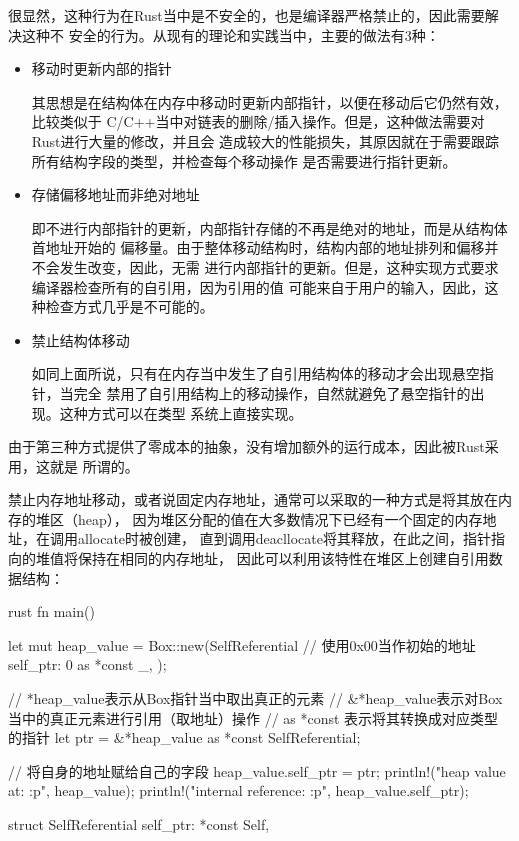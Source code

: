 很显然，这种行为在Rust当中是不安全的，也是编译器严格禁止的，因此需要解决这种不
安全的行为。从现有的理论和实践当中，主要的做法有3种：
\begin{itemize}
  \item 移动时更新内部的指针

  其思想是在结构体在内存中移动时更新内部指针，以便在移动后它仍然有效，比较类似于
  C/C++当中对链表的删除/插入操作。但是，这种做法需要对Rust进行大量的修改，并且会
  造成较大的性能损失，其原因就在于需要跟踪所有结构字段的类型，并检查每个移动操作
  是否需要进行指针更新。

  \item 存储偏移地址而非绝对地址

  即不进行内部指针的更新，内部指针存储的不再是绝对的地址，而是从结构体首地址开始的
  偏移量。由于整体移动结构时，结构内部的地址排列和偏移并不会发生改变，因此，无需
  进行内部指针的更新。但是，这种实现方式要求编译器检查所有的自引用，因为引用的值
  可能来自于用户的输入，因此，这种检查方式几乎是不可能的。

  \item 禁止结构体移动

  如同上面所说，只有在内存当中发生了自引用结构体的移动才会出现悬空指针，当完全
  禁用了自引用结构上的移动操作，自然就避免了悬空指针的出现。这种方式可以在类型
  系统上直接实现。
\end{itemize}

由于第三种方式提供了零成本的抽象，没有增加额外的运行成本，因此被Rust采用，这就是
所谓的。

禁止内存地址移动，或者说固定内存地址，通常可以采取的一种方式是将其放在内存的堆区（heap），
因为堆区分配的值在大多数情况下已经有一个固定的内存地址，在调用allocate时被创建，
直到调用deacllocate将其释放，在此之间，指针指向的堆值将保持在相同的内存地址，
因此可以利用该特性在堆区上创建自引用数据结构：
\begin{code-block}{rust}
fn main() {
    let mut heap_value = Box::new(SelfReferential {
        // 使用0x00当作初始的地址
        self_ptr: 0 as *const _,
    });

    // *heap_value表示从Box指针当中取出真正的元素
    // &*heap_value表示对Box当中的真正元素进行引用（取地址）操作
    // as *const 表示将其转换成对应类型的指针
    let ptr = &*heap_value as *const SelfReferential;

    // 将自身的地址赋给自己的字段
    heap_value.self_ptr = ptr;
    println!("heap value at: {:p}", heap_value);
    println!("internal reference: {:p}", heap_value.self_ptr);
}
struct SelfReferential {
    self_ptr: *const Self,
}
\end{code-block}

